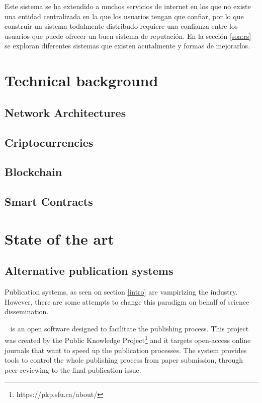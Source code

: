 Este sistema se ha extendido a muchos servicios de internet en los que no existe
una entidad centralizada en la que los usuarios tengan que confiar, por lo que
construir un sistema todalmente distribudo requiere una confianza entre los
usuarios que puede ofrecer un buen sistema de reputación. En la sección
\ref{soa:rs} se exploran diferentes sistemas que existen acutalmente y formas de
mejorarlos.

\section{Technical background}
\label{tb}
\subsection{Network Architectures}
\label{tb:na}
\lip {}

\subsection{Criptocurrencies}
\label{tb:cryptos}
\lip

\subsection{Blockchain}
\label{tb:blockchain}
\lip

\subsection{Smart Contracts}
\label{tb:smartcontracts}
\lip

\section{State of the art}
\subsection{Alternative publication systems}
\label{soa:aps}
Publication systems, as seen on section \ref{intro} are vampirizing the
industry. However, there are some attempts to change this paradigm on behalf of
science dissemination.

~\cite{willinsky2005open} is an open software designed
to facilitate the publishing process. This project was created by the Public
Knowledge Project\footnote{https://pkp.sfu.ca/about/} and it targets open-access
online journals that want to speed up the publication processes. The system
provides tools to control the whole publishing process from paper submission,
through peer reviewing to the final publication issue.

